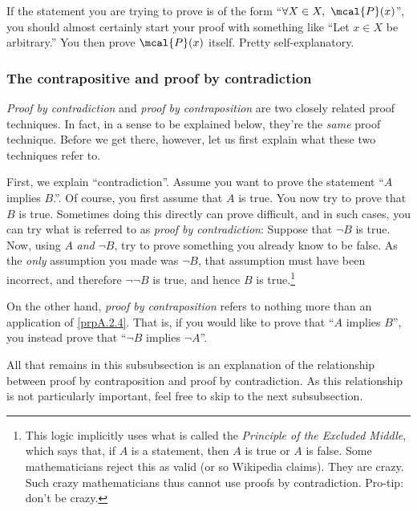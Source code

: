 If the statement you are trying to prove is of the form ``$\forall X\in X,\ \mcal{P}(x)$'', you should almost certainly start your proof with something like ``Let $x\in X$ be arbitrary.''  You then prove $\mcal{P}(x)$ itself.  Pretty self-explanatory.

\subsubsection{The contrapositive and proof by contradiction}

\emph{Proof by contradiction} and \emph{proof by contraposition} are two closely related proof techniques.  In fact, in a sense to be explained below, they're the \emph{same} proof technique.  Before we get there, however, let us first explain what these two techniques refer to.

First, we explain ``contradiction''.  Assume you want to prove the statement ``$A$ implies $B$.''.  Of course, you first assume that $A$ is true.  You now try to prove that $B$ is true.  Sometimes doing this directly can prove difficult, and in such cases, you can try what is referred to as \emph{proof by contradiction}:  Suppose that $\neg B$ is true.  Now, using $A$ \emph{and} $\neg B$, try to prove something you already know to be false.  As the \emph{only} assumption you made was $\neg B$, that assumption must have been incorrect, and therefore $\neg \neg B$ is true, and hence $B$ is true.\footnote{This logic implicitly uses what is called the \emph{Principle of the Excluded Middle}, which says that, if $A$ is a statement, then $A$ is true or $A$ is false.  Some mathematicians reject this as valid (or so Wikipedia claims).  They are crazy.  Such crazy mathematicians thus cannot use proofs by contradiction.  Pro-tip:  don't be crazy.}

On the other hand, \emph{proof by contraposition} refers to nothing more than an application of \cref{prpA.2.4}.  That is, if you would like to prove that ``$A$ implies $B$'', you instead prove that ``$\neg B$ implies $\neg A$''.

All that remains in this subsubsection is an explanation of the relationship between proof by contraposition and proof by contradiction.  As this relationship is not particularly important, feel free to skip to the next subsubsection.

